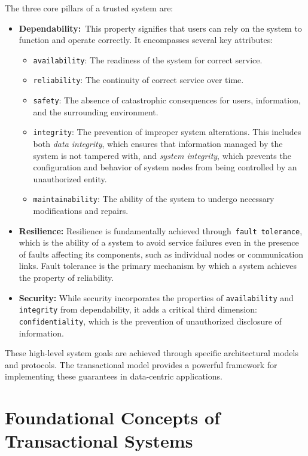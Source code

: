 \documentclass{scrbook}
\begin{document}
The three core pillars of a trusted system are:

\begin{itemize}
\item
  \textbf{Dependability:}~This property signifies that users can rely on
  the system to function and operate correctly. It encompasses several
  key attributes:

  \begin{itemize}
  \item
    \texttt{availability}: The readiness of the system for correct
    service.
  \item
    \texttt{reliability}: The continuity of correct service over time.
  \item
    \texttt{safety}: The absence of catastrophic consequences for users,
    information, and the surrounding environment.
  \item
    \texttt{integrity}: The prevention of improper system alterations.
    This includes both \emph{data integrity}, which ensures that
    information managed by the system is not tampered with, and \emph{system integrity}, which prevents the configuration and
    behavior of system nodes from being controlled by an unauthorized entity.
  \item
    \texttt{maintainability}: The ability of the system to undergo necessary modifications and repairs.
  \end{itemize}
\item
  \textbf{Resilience:} Resilience is fundamentally achieved
  through~\texttt{fault\ tolerance}, which is the ability of a system to
  avoid service failures even in the presence of faults affecting its
  components, such as individual nodes or communication links. Fault
  tolerance is the primary mechanism by which a system achieves the
  property of reliability.


\item 
    \textbf{Security:} While security incorporates the properties of \texttt{availability} and \texttt{integrity} from dependability, it adds a critical third dimension: \texttt{confidentiality}, which is the prevention of unauthorized disclosure of information.
\end{itemize}

These high-level system goals are achieved through specific
architectural models and protocols. The transactional model provides a
powerful framework for implementing these guarantees in data-centric
applications.

\section{Foundational Concepts of Transactional Systems}
\end{document}
